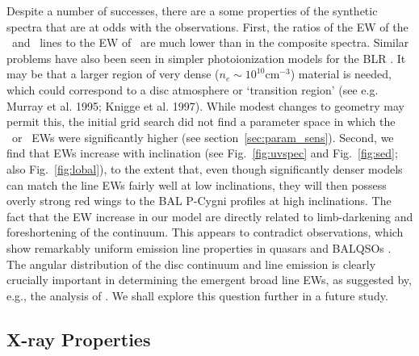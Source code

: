 \documentclass[useAMS,usenatbib]{mn2e_x}
\begin{document}
Despite a number of successes, 
there are a some properties of the synthetic spectra
that are at odds with the observations. First, the ratios of the 
EW of the \la\ and \mgline\ lines
to the EW of \civline\ are much lower than in the composite spectra. 
Similar problems have also been seen in simpler photoionization models for the 
BLR \citep{netzer1990}.
It may be that a larger region of very dense ($n_e\sim10^{10}$cm$^{-3}$) 
material is needed, which could correspond to a disc atmosphere or 
`transition region' 
(see e.g. Murray et al. 1995; Knigge et al. 1997). \nocite{knigge1998} 
While modest changes to geometry may permit this, the initial grid search 
did not find a parameter space in which the \la\ or \mg\ EWs
were significantly higher (see section~\ref{sec:param_sens}). 
Second, we find that EWs increase with inclination 
(see Fig.~\ref{fig:uvspec} and Fig.~\ref{fig:sed}; also Fig.~\ref{fig:lobal}), 
to the extent that, even though significantly denser
models can match the line EWs fairly well at low inclinations, they will then
possess overly strong red wings to the BAL P-Cygni profiles at high inclinations.
The fact that the EW increase in our model are directly related to limb-darkening 
and foreshortening of the continuum. 
This appears to contradict observations, which show remarkably uniform emission
line properties in quasars and BALQSOs \citep{weymann1991,dipompeo2012b}. 
The angular distribution of the disc 
continuum and line emission is clearly crucially important in determining the emergent broad 
line EWs, as suggested by, e.g., the analysis of \cite{risaliti2011}. 
We shall explore this question further in a future study.  

\subsection{X-ray Properties}
\label{sec:xray}
\end{document}
